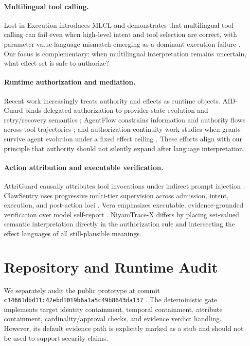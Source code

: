 \paragraph{Multilingual tool calling.}
Lost in Execution introduces MLCL and demonstrates that multilingual tool calling can fail even when high-level intent and tool selection are correct, with parameter-value language mismatch emerging as a dominant execution failure \cite{lostexecution2026}. Our focus is complementary: when multilingual interpretation remains uncertain, what effect set is safe to authorize?

\paragraph{Runtime authorization and mediation.}
Recent work increasingly treats authority and effects as runtime objects. AID-Guard binds delegated authorization to provider-state evolution and retry/recovery semantics \cite{aidguard2026}; AgentFlow constrains information and authority flows across tool trajectories \cite{agentflow2026}; and authorization-continuity work studies when grants survive agent evolution under a fixed effect ceiling \cite{authcontinuity2026}. These efforts align with our principle that authority should not silently expand after language interpretation.

\paragraph{Action attribution and executable verification.}
AttriGuard causally attributes tool invocations under indirect prompt injection \cite{attriguard2026}. ClawSentry uses progressive multi-tier supervision across admission, intent, execution, and post-action loci \cite{clawsentry2026}. Vera emphasizes executable, evidence-grounded verification over model self-report \cite{vera2026}. NiyamTrace-X differs by placing set-valued semantic interpretation directly in the authorization rule and intersecting the effect languages of all still-plausible meanings.

\section{Repository and Runtime Audit}
\label{sec:audit}

We separately audit the public prototype at commit \texttt{c14661dbd11c42ebd1019b6a1a5c49b8643da137} \cite{niyamtrace_repo}. The deterministic gate implements target identity containment, temporal containment, attribute containment, cardinality/approval checks, and evidence verdict handling. However, its default evidence path is explicitly marked as a stub and should not be used to support security claims.

